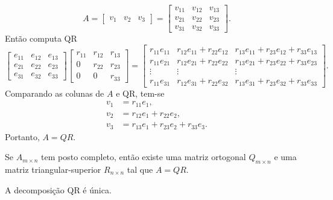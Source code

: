 \documentclass{article}
\begin{document}
\[
    A = \begin{bmatrix}
        v_1 & v_2 & v_3
    \end{bmatrix} = 
    \begin{bmatrix}
        v_{11} & v_{12} & v_{13} \\
        v_{21} & v_{22} & v_{23} \\
        v_{31} & v_{32} & v_{33}
    \end{bmatrix}.
\]
Então computa QR
    \begin{equation*}
        \begin{bmatrix}
            e_{11} & e_{12} & e_{13} \\
            e_{21} & e_{22} & e_{23} \\
            e_{31} & e_{32} & e_{33}
        \end{bmatrix}
        \begin{bmatrix}
            r_{11} & r_{12} & r_{13} \\
            0 & r_{22} & r_{23} \\
            0 & 0 & r_{33}
        \end{bmatrix} = 
        \begin{bmatrix}
            r_{11}e_{11} & r_{12}e_{11}+r_{22}e_{12} & r_{13}e_{11}+r_{23}e_{12}+r_{33}e_{13} \\
            r_{11}e_{21} & r_{12}e_{21}+r_{22}e_{22} & r_{13}e_{21}+r_{23}e_{22}+r_{33}e_{23} \\
            \vdots & \vdots & \vdots \\
            r_{11}e_{31} & r_{12}e_{31}+r_{22}e_{32} & r_{13}e_{31}+r_{23}e_{32}+r_{33}e_{33}
        \end{bmatrix}.
    \end{equation*}
Comparando as colunas de \(A\) e QR, tem-se
    \begin{align*}
        v_1 &= r_{11} e_1, \\
        v_2 &= r_{12} e_1 + r_{22} e_2, \\
        v_3 &= r_{13} e_1 + r_{23} e_2 + r_{33} e_3.
    \end{align*}
Portanto, \(A=QR\).

\begin{thm}
    Se \(A_{m \times n}\) tem posto completo, então existe uma matriz ortogonal \(Q_{m \times n}\) e uma matriz triangular-superior \(R_{n \times n}\) tal que \(A = QR\).
\end{thm}

\begin{rem}
    A decomposição QR é única.
\end{rem}
\end{document}
